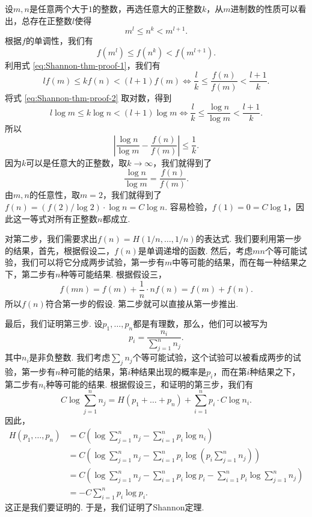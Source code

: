 设$m,n$是任意两个大于$1$的整数，再选任意大的正整数$k$，从$m$进制数的性质可以看出，总存在正整数$l$使得
\begin{equation}
    m^l\leq n^k < m^{l+1}.\label{eq:Shannon-thm-proof-2}
\end{equation}
根据$f$的单调性，我们有
\[
    f(m^l)\leq f(n^k) < f(m^{l+1}).
\]
利用式 \eqref{eq:Shannon-thm-proof-1}，我们有
\[
    lf(m)\leq kf(n) < (l+1)f(m)\iff \frac{l}{k}\leq \frac{f(n)}{f(m)} < \frac{l+1}{k}.
\]
将式 \eqref{eq:Shannon-thm-proof-2} 取对数，得到
\[
    l\log m\leq k\log n < (l+1)\log m\iff \frac{l}{k}\leq \frac{\log n}{\log m} < \frac{l+1}{k}.
\]
所以
\[
    \left|\frac{\log n}{\log m}-\frac{f(n)}{f(m)}\right|\leq\frac1k.
\]
因为$k$可以是任意大的正整数，取$k\to\infty$，我们就得到了
\[
    \frac{\log n}{\log m}=\frac{f(n)}{f(m)}.
\]
由$m,n$的任意性，取$m=2$，我们就得到了$f(n)=(f(2)/\log 2)\cdot \log n= C\log n$. 容易检验，$f(1)=0=C\log 1$，因此这一等式对所有正整数$n$都成立.

对第二步，我们需要求出$f(n)=H(1/n,\dots,1/n)$的表达式. 我们要利用第一步的结果，首先，根据假设二，$f(n)$是单调递增的函数. 然后，考虑$mn$个等可能试验，我们可以将它分成两步试验，第一步有$m$中等可能的结果，而在每一种结果之下，第二步有$n$种等可能结果. 根据假设三，
\[
f(mn)=f(m)+\frac{1}{n}\cdot nf(n)=f(m)+f(n).    
\]
所以$f(n)$符合第一步的假设. 第二步就可以直接从第一步推出.

最后，我们证明第三步. 设$p_1,\dots,p_n$都是有理数，那么，他们可以被写为
\[
    p_i=\frac{n_i}{\sum_{j=1}^n n_j}.
\]
其中$n_i$是非负整数. 我们考虑$\sum_j n_j$个等可能试验，这个试验可以被看成两步的试验，第一步有$n$种可能的结果，第$i$种结果出现的概率是$p_i$，而在第$i$种结果之下，第二步有$n_i$种等可能的结果. 根据假设三，和证明的第三步，我们有
\[
   C\log\sum_{j=1}^nn_j=H(p_1+\dots+p_n)+\sum_{i=1}^n p_i\cdot C\log n_i.
\]
因此，
\begin{align*}
    H(p_1,\dots,p_n)&=C\left(\log\sum_{j=1}^nn_j-\sum_{i=1}^n p_i\log n_i\right)\\
    &=C\left(\log\sum_{j=1}^nn_j-\sum_{i=1}^n p_i\log\left(p_i\sum_{j=1}^n n_j\right)\right)\\
    &=C\left(\log\sum_{j=1}^nn_j-\sum_{i=1}^n p_i\log p_i-\sum_{i=1}^n p_i\log\sum_{j=1}^n n_j\right)\\
    &=-C\sum_{i=1}^n p_i\log p_i.
\end{align*}
这正是我们要证明的. 于是，我们证明了Shannon定理.

